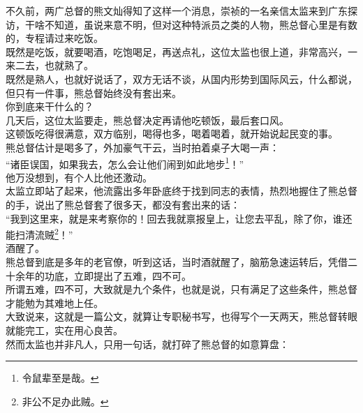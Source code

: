 \begin{multicols}{\theparacolNo}
不久前，两广总督的熊文灿得知了这样一个消息，崇祯的一名亲信太监来到广东探访，干啥不知道，虽说来意不明，但对这种特派员之类的人物，熊总督心里是有数的，专程请过来吃饭。\\

既然是吃饭，就要喝酒，吃饱喝足，再送点礼，这位太监也很上道，非常高兴，一来二去，也就熟了。\\

既然是熟人，也就好说话了，双方无话不谈，从国内形势到国际风云，什么都说，但只有一件事，熊总督始终没有套出来。\\

你到底来干什么的？\\

几天后，这位太监要走，熊总督决定再请他吃顿饭，最后套口风。\\

这顿饭吃得很满意，双方临别，喝得也多，喝着喝着，就开始说起民变的事。\\

熊总督估计是喝多了，外加豪气干云，当时拍着桌子大喝一声：\\

“诸臣误国，如果我去，怎么会让他们闹到如此地步\footnote{令鼠辈至是哉。}！”\\

他万没想到，有个人比他还激动。\\

太监立即站了起来，他流露出多年卧底终于找到同志的表情，热烈地握住了熊总督的手，说出了熊总督套了很多天，都没有套出来的话：\\

“我到这里来，就是来考察你的！回去我就禀报皇上，让您去平乱，除了你，谁还能扫清流贼\footnote{非公不足办此贼。}！”\\

酒醒了。\\

熊总督到底是多年的老官僚，听到这话，当时酒就醒了，脑筋急速运转后，凭借二十余年的功底，立即提出了五难，四不可。\\

所谓五难，四不可，大致就是九个条件，也就是说，只有满足了这些条件，熊总督才能勉为其难地上任。\\

大致说来，这就是一篇公文，就算让专职秘书写，也得写个一天两天，熊总督转眼就能完工，实在用心良苦。\\

然而太监也并非凡人，只用一句话，就打碎了熊总督的如意算盘：\\


\end{multicols}
